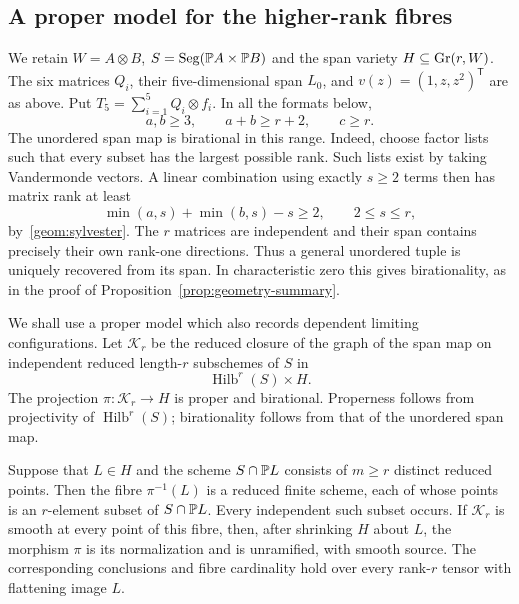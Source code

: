 \subsection{A proper model for the higher-rank fibres}
\label{nf:graph-setup}

We retain $W=A\otimes B$, $S=\operatorname{Seg}(\mathbb P A\times\mathbb P B)$ and the
span variety $H\subseteq\operatorname{Gr}(r,W)$. The six matrices $Q_i$, their
five-dimensional span $L_0$, and $v(z)=(1,z,z^2)^{\mathsf T}$ are as
above. Put $T_5=\sum_{i=1}^5Q_i\otimes f_i$. In all the formats below,
\[
 a,b\geq3,\qquad a+b\geq r+2,\qquad c\geq r.
\]
The unordered span map is birational in this range. Indeed, choose
factor lists such that every subset has the largest possible rank.
Such lists exist by taking Vandermonde vectors. A linear combination
using exactly $s\geq2$ terms then has matrix rank at least
\[
 \min(a,s)+\min(b,s)-s\geq2,
 \qquad 2\leq s\leq r,
\]
by~\eqref{geom:sylvester}. The $r$ matrices are independent and their
span contains precisely their own rank-one directions. Thus a general
unordered tuple is uniquely recovered from its span. In characteristic
zero this gives birationality, as in the proof of
Proposition~\ref{prop:geometry-summary}.

We shall use a proper model which also records dependent limiting
configurations. Let $\mathcal K_r$ be the reduced closure of the graph
of the span map on independent reduced length-$r$ subschemes of $S$ in
\[
 \operatorname{Hilb}^r(S)\times H.
\]
The projection $\pi:\mathcal K_r\to H$ is proper and birational.
Properness follows from projectivity of $\operatorname{Hilb}^r(S)$;
birationality follows from that of the unordered span map.

\begin{lemma}
\label{nf:proper-graph}
Suppose that $L\in H$ and the scheme $S\cap\mathbb P L$ consists of
$m\geq r$ distinct reduced points. Then the fibre $\pi^{-1}(L)$ is a
reduced finite scheme, each of whose points is an $r$-element subset of
$S\cap\mathbb P L$. Every independent such subset occurs. If
$\mathcal K_r$ is smooth at every point of this fibre, then, after
shrinking $H$ about $L$, the morphism $\pi$ is its normalization and
is unramified, with smooth source. The corresponding conclusions and
fibre cardinality hold over every rank-$r$ tensor with flattening image
$L$.
\end{lemma}

